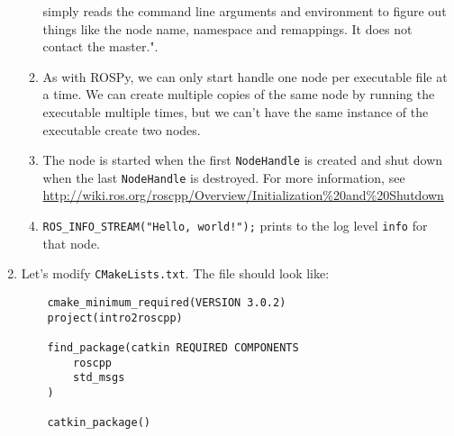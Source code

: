 \documentclass{article}
\begin{document}
\begin{enumerate}
\begin{enumerate}
                simply reads the command line arguments and environment to figure out things like the node
                name, namespace and remappings. It does not contact the master.".
                \item As with ROSPy, we can only start handle one node per executable file at a time. We can 
                create multiple copies of the same node by running the executable multiple times, but we 
                can't have the same instance of the executable create two nodes.
                \item The node is started when the first \texttt{NodeHandle} is created and shut down when 
                the last \texttt{NodeHandle} is destroyed. For more information, see \url{http://wiki.ros.org/roscpp/Overview/Initialization%20and%20Shutdown}
                \item \texttt{ROS_INFO_STREAM("Hello, world!");} prints to the log level \texttt{info}
                for that node.
            \end{enumerate}
            \item Let's modify \texttt{CMakeLists.txt}. The file should look like:
            \begin{verbatim}
    cmake_minimum_required(VERSION 3.0.2)
    project(intro2roscpp)
    
    find_package(catkin REQUIRED COMPONENTS
        roscpp
        std_msgs
    )
    
    catkin_package()
    

\end{verbatim}
\end{enumerate}
\end{document}
